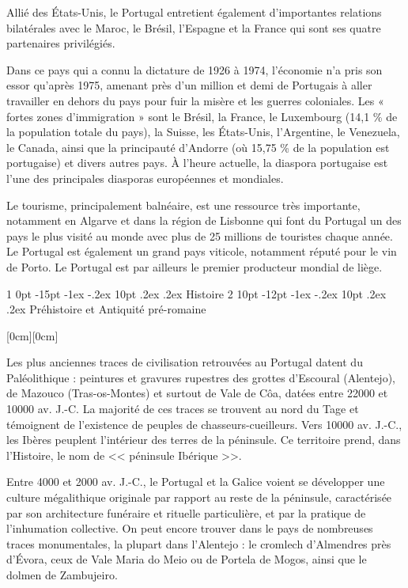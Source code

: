 \documentclass[10pt,openright,oneside,french]{book}
\makeatletter
\renewcommand{\section}{%
    \@startsection{section}%
    {1}%
    {0pt}%
    {-15pt \@plus -1ex \@minus -.2ex}%
    {10pt \@plus .2ex \@minus .2ex}%
    {\normalfont\Large\bfseries\color{red}}%
}
\renewcommand{\subsection}{%
    \@startsection{subsection}%
    {2}%
    {10pt}%
    {-12pt \@plus -1ex \@minus -.2ex}%
    {10pt \@plus .2ex \@minus.2ex}%
    {\normalfont\large\bfseries\color{OliveGreen}}%
}
\newcommand\Note[2][0cm]{
\hspace{-3.3cm}
    \raisebox{#1}[0cm][0cm]{
        \makebox[0cm][l]{
            \parbox{2.65cm}{
                \raggedright
                \scriptsize #2
                }
            }
        }
\hspace{2.85cm}
}
\makeatother
\begin{document}
Allié des États-Unis, le Portugal entretient également d'importantes relations bilatérales avec le Maroc, le Brésil, l'Espagne et la France qui sont ses quatre partenaires privilégiés.

Dans ce pays qui a connu la dictature de 1926 à 1974, l'économie n'a pris son essor qu'après 1975, amenant près d'un million et demi de Portugais à aller travailler en dehors du pays pour fuir la misère et les guerres coloniales. Les « fortes zones d'immigration » sont le Brésil, la France, le Luxembourg (14,1 \% de la population totale du pays), la Suisse, les États-Unis, l'Argentine, le Venezuela, le Canada, ainsi que la principauté d'Andorre (où 15,75 \% de la population est portugaise) et divers autres pays. À l'heure actuelle, la diaspora portugaise est l'une des principales diasporas européennes et mondiales.

Le tourisme, principalement balnéaire, est une ressource très importante, notamment en Algarve et dans la région de Lisbonne qui font du Portugal un des pays le plus visité au monde avec plus de 25 millions de touristes chaque année. Le Portugal est également un grand pays viticole, notamment réputé pour le vin de Porto. Le Portugal est par ailleurs le premier producteur mondial de liège.

\section{Histoire}
\subsection{Préhistoire et Antiquité pré-romaine}

\Note{Partie très importante}
Les plus anciennes traces de civilisation retrouvées au Portugal datent du Paléolithique : peintures et gravures rupestres des grottes d'Escoural (Alentejo), de Mazouco (Tras-os-Montes) et surtout de Vale de Côa, datées entre 22000 et 10000 av. J.-C. La majorité de ces traces se trouvent au nord du Tage et témoignent de l'existence de peuples de chasseurs-cueilleurs. Vers 10000 av. J.-C., les Ibères peuplent l'intérieur des terres de la péninsule. Ce territoire prend, dans l'Histoire, le nom de << péninsule Ibérique >>.

Entre 4000 et 2000 av. J.-C., le Portugal et la Galice voient se développer une culture mégalithique originale par rapport au reste de la péninsule, caractérisée par son architecture funéraire et rituelle particulière, et par la pratique de l'inhumation collective. On peut encore trouver dans le pays de nombreuses traces monumentales, la plupart dans l'Alentejo : le cromlech d'Almendres près d'Évora, ceux de Vale Maria do Meio ou de Portela de Mogos, ainsi que le dolmen de Zambujeiro.
\end{document}
